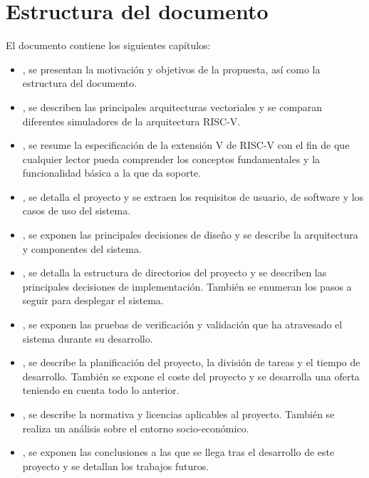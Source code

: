 \section{Estructura del documento}\label{sec:structure}
El documento contiene los siguientes capítulos:
\begin{itemize}
  \item {}, se presentan la motivación y objetivos de la propuesta, así como la estructura del documento.
  \item {}, se describen las principales arquitecturas vectoriales y se comparan diferentes simuladores de la arquitectura RISC-V.
  \item {}, se resume la especificación de la extensión V de RISC-V con el fin de que cualquier lector pueda comprender los conceptos fundamentales y la funcionalidad básica a la que da soporte.
  \item {}, se detalla el proyecto y se extraen los requisitos de usuario, de software y los casos de uso del sistema.
  \item {}, se exponen las principales decisiones de diseño y se describe la arquitectura y componentes del sistema.
  \item {}, se detalla la estructura de directorios del proyecto y se describen las principales decisiones de implementación. También se enumeran los pasos a seguir para desplegar el sistema.
  \item {}, se exponen las pruebas de verificación y validación que ha atravesado el sistema durante su desarrollo.
  \item {}, se describe la planificación del proyecto, la división de tareas y el tiempo de desarrollo. También se expone el coste del proyecto y se desarrolla una oferta teniendo en cuenta todo lo anterior.
  \item {}, se describe la normativa y licencias aplicables al proyecto. También se realiza un análisis sobre el entorno socio-económico.
  \item {}, se exponen las conclusiones a las que se llega tras el desarrollo de este proyecto y se detallan los trabajos futuros.
\end{itemize}